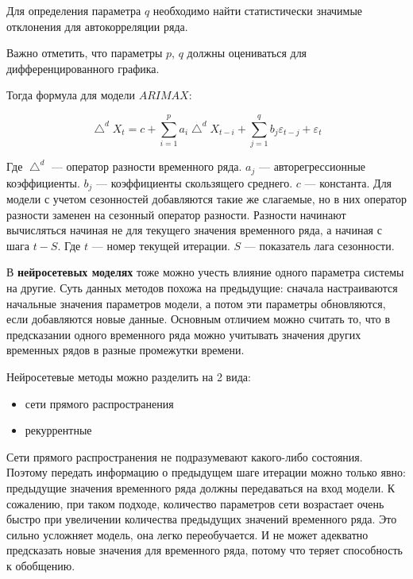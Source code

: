 Для определения параметра $ q $ необходимо найти статистически значимые отклонения
для автокорреляции ряда.

Важно отметить, что параметры $ p $, $ q $ должны оцениваться для дифференцированного графика.

Тогда формула для модели $ ARIMAX $:

\begin{equation}
	\bigtriangleup^{d} X_t = c + \sum_{i=1}^{p}{ a_i\bigtriangleup^{d}X_{t-i} } + \sum_{j=1}^{q}{ b_{j} \varepsilon_{t-j} + \varepsilon_t }
\end{equation}

\noindent Где $ \bigtriangleup^{d} $ --- оператор разности временного ряда. $ a_{j} $ --- авторегрессионные
коэффициенты.  $ b_{j} $ --- коэффициенты скользящего среднего. $ c $ --- константа.
Для модели с учетом сезонностей добавляются такие же слагаемые, но в них
оператор разности заменен на сезонный оператор разности.
Разности начинают вычисляться начиная не для текущего значения временного ряда,
а начиная с шага $ t - S $. Где $ t $ --- номер текущей итерации. $ S $ --- показатель лага сезонности.

В \textbf{нейросетевых моделях} тоже можно учесть влияние одного параметра системы на другие.
Суть данных методов похожа на предыдущие: сначала настраиваются начальные
значения параметров модели, а потом эти параметры обновляются, если добавляются новые данные.
Основным отличием можно считать то, что в предсказании одного временного ряда можно
учитывать значения других временных рядов в разные промежутки времени.

Нейросетевые методы можно разделить на 2 вида:
\begin{itemize}
	\item сети прямого распространения \cite{svozil1997introduction}
	\item рекуррентные \cite{zaremba2014recurrent}
\end{itemize}

Сети прямого распространения не подразумевают какого-либо состояния.
Поэтому передать информацию о предыдущем шаге итерации можно только явно:
предыдущие значения временного ряда должны передаваться на вход модели.
К сожалению, при таком подходе, количество параметров сети возрастает очень быстро
при увеличении количества предыдущих значений временного ряда. Это сильно усложняет модель,
она легко переобучается. И не может адекватно предсказать новые значения для временного ряда,
потому что теряет способность к обобщению.


